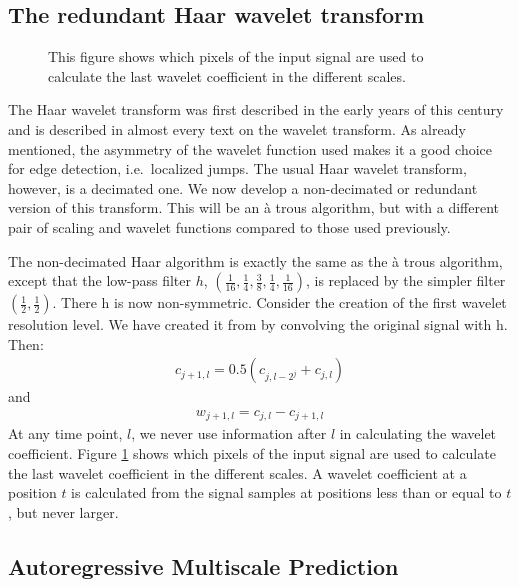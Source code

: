 \subsection{The redundant Haar wavelet transform}

\begin{figure}[htb]
\centerline{
\vbox{ 
}}
\caption{This figure shows which pixels of the input signal are used
to calculate the last wavelet coefficient in the different scales.}
\label{fig_haar}
\end{figure}  
The Haar wavelet transform was first described in the early years of this 
century and is described in almost every text on the wavelet
transform. As already mentioned, the asymmetry of the wavelet function 
used makes it a good choice for edge detection, i.e.\ localized
jumps. The usual Haar wavelet transform, however, is a decimated one. 
We now develop a non-decimated or redundant version of this
transform. This will be an \`a trous algorithm, but with a different pair 
of scaling and wavelet functions compared to those used previously.

The non-decimated Haar algorithm is exactly the same as the \`a trous 
algorithm, except that the low-pass filter $h$, 
$(\frac{1}{16}, \frac{1}{4}, \frac{3}{8},
\frac{1}{4}, \frac{1}{16})$,
is replaced by the simpler filter $(\frac{1}{2},\frac{1}{2})$. 
There h is now non-symmetric. 
Consider the creation of the first wavelet resolution level. We
have  created it from  by convolving the original signal with h. Then:
\begin{eqnarray}
c_{j+1,l} = 0.5( c_{j,l-2^j} +  c_{j,l})
\end{eqnarray}
and
\begin{eqnarray}
w_{j+1,l} =  c_{j,l}  - c_{j+1,l}
\end{eqnarray}
At any time point, $l$, we never use information after $l$ in 
calculating the 
wavelet coefficient. 
Figure \ref{fig_haar} shows which pixels of the input signal are used
to calculate the last wavelet coefficient in the different scales.
A wavelet coefficient at a
position $t$ is calculated from the signal samples at positions less
than or equal to $t$, but never larger.

\subsection{Autoregressive Multiscale Prediction}
\label{sect_AR_pred}
